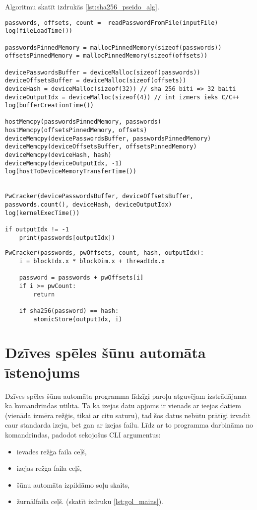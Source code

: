 Algoritmu skatīt izdrukās \ref{lst:sha256_pseido_alg}.
\begin{lstlisting}[caption={Paroļu atguvēja CPU puses pseidokods},
captionpos=b,
    label=lst:sha256_pseido_alg]
passwords, offsets, count =  readPasswordFromFile(inputFile)
log(fileLoadTime())

passwordsPinnedMemory = mallocPinnedMemory(sizeof(passwords))
offsetsPinnedMemory = mallocPinnedMemory(sizeof(offsets))

devicePasswordsBuffer = deviceMalloc(sizeof(passwords))
deviceOffsetsBuffer = deviceMalloc(sizeof(offsets))
deviceHash = deviceMalloc(sizeof(32)) // sha 256 biti => 32 baiti
deviceOutputIdx = deviceMalloc(sizeof(4)) // int izmers ieks C/C++
log(bufferCreationTime())

hostMemcpy(passwordsPinnedMemory, passwords)
hostMemcpy(offsetsPinnedMemory, offsets)
deviceMemcpy(devicePasswordsBuffer, passwordsPinnedMemory)
deviceMemcpy(deviceOffsetsBuffer, offsetsPinnedMemory)
deviceMemcpy(deviceHash, hash)
deviceMemcpy(deviceOutputIdx, -1)
log(hostToDeviceMemoryTransferTime())


PwCracker(devicePasswordsBuffer, deviceOffsetsBuffer, passwords.count(), deviceHash, deviceOutputIdx)
log(kernelExecTime())

if outputIdx != -1
    print(passwords[outputIdx])
\end{lstlisting}


\begin{lstlisting}[caption={Paroļu atguvēja GPGPU kodola pseidokods},
    captionpos=b,
    label=lst:sha256_pseido_alg_device]
PwCracker(passwords, pwOffsets, count, hash, outputIdx):
    i = blockIdx.x * blockDim.x + threadIdx.x

    password = passwords + pwOffsets[i]
    if i >= pwCount:
        return

    if sha256(password) == hash:
        atomicStore(outputIdx, i)
\end{lstlisting}

\section{Dzīves spēles šūnu automāta īstenojums} \label{gol_section}
Dzīves spēles šūnu automāta programma līdzīgi paroļu atguvējam izstrādājama kā
komandrindas utilīta. Tā kā izejas datu apjoms ir vienāds ar ieejas datiem
(vienāda izmēra režģis, tikai ar citu saturu), tad šos datus nebūtu prātīgi
izvadīt caur standarda izeju, bet gan ar izejas failu. Līdz ar to
programma darbināma no komandrindas, padodot sekojošus CLI argumentus:
\begin{itemize}
    \item ievades režģa faila ceļš,
    \item izejas režģa faila ceļš,
    \item šūnu automāta izpildāmo soļu skaits,
    \item žurnālfaila ceļš. (skatīt izdruku \ref{lst:gol_mains}).
\end{itemize}

